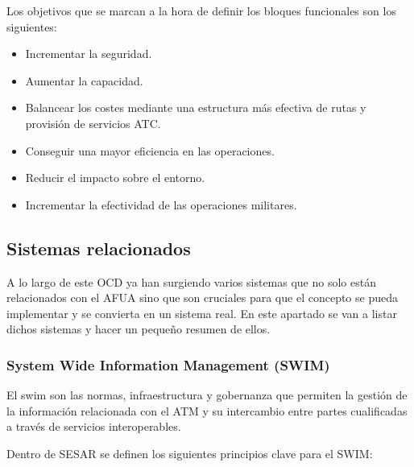 Los objetivos que se marcan a la hora de definir los bloques funcionales son los siguientes:

\begin{itemize}
    \item Incrementar la seguridad.
    \item Aumentar la capacidad.
    \item Balancear los costes mediante una estructura más efectiva de rutas y provisión de servicios ATC.
    \item Conseguir una mayor eficiencia en las operaciones.
    \item Reducir el impacto sobre el entorno.
    \item Incrementar la efectividad de las operaciones militares.
\end{itemize}

\subsection{Sistemas relacionados}

A lo largo de este OCD ya han surgiendo varios sistemas que no solo están relacionados con el AFUA sino que son cruciales para que el concepto se pueda implementar y se convierta en un sistema real. En este apartado se van a listar dichos sistemas y hacer un pequeño resumen de ellos.

\subsubsection{System Wide Information Management (SWIM)}

El \acrfull{swim} son las normas, infraestructura y gobernanza que permiten la gestión de la información relacionada con el ATM y su intercambio entre partes cualificadas a través de servicios interoperables.

Dentro de SESAR se definen los siguientes principios clave  para el SWIM:

